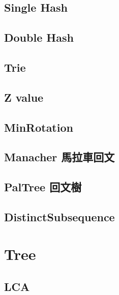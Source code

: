 \subsection{Single Hash}


\subsection{Double Hash}


\subsection{Trie}


\subsection{Z value}


\subsection{MinRotation}


\subsection{Manacher 馬拉車回文}


\subsection{PalTree 回文樹}


\subsection{DistinctSubsequence}

\section{Tree}

\subsection{LCA}


